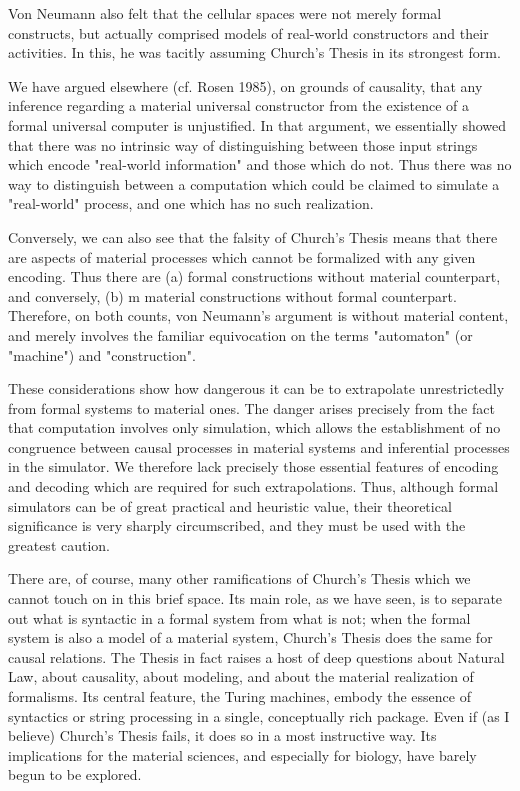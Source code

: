 \documentclass[a4paper,12pt]{article}
\begin{document}
Von Neumann also felt that the cellular spaces were not merely formal constructs, but actually comprised models of real-world
constructors and their activities. In this, he was tacitly assuming Church's Thesis in its strongest form.

We have argued elsewhere (cf. Rosen 1985), on grounds of causality, that
any inference regarding a material universal constructor from the existence
of a formal universal computer is unjustified.  In that argument, we essentially
showed that there was no intrinsic way of distinguishing between
those input strings which encode "real-world information" and those which
do not. Thus there was no way to distinguish between a computation which
could be claimed to simulate a "real-world" process, and one which has no
such realization.

Conversely, we can also see that the falsity of Church's Thesis means that there are aspects of material processes which cannot be formalized with any given encoding.
Thus there are (a) formal constructions without material counterpart, and conversely, (b) m material constructions without formal counterpart.
Therefore, on both counts, von Neumann's argument is without material content, and merely involves the familiar equivocation on
the terms "automaton" (or "machine") and "construction".

These considerations show how dangerous it can be to extrapolate unrestrictedly from formal systems to material ones.
The danger arises precisely from the fact that computation involves only simulation, which allows the establishment of
no congruence between causal processes in material systems and inferential processes in the simulator. We therefore lack precisely
those essential features of encoding and decoding which are required for such extrapolations. Thus, although formal simulators can be of
great practical and heuristic value, their theoretical significance is very sharply circumscribed, and they must be used with the greatest caution.

There are, of course, many other ramifications of Church's Thesis which we cannot touch on in this brief space. Its main role, as we have seen,
is to separate out what is syntactic in a formal system from what is not; when the formal system is also a model of a material system,
Church's Thesis does the same for causal relations. The Thesis in fact raises a host of deep questions about Natural Law, about causality,
about modeling, and about the material realization of formalisms. Its central feature, the Turing machines, embody the essence of syntactics
or string processing in a single, conceptually rich package. Even if (as I believe) Church's Thesis fails, it does so in a most instructive way.
Its implications for the material sciences, and especially for biology, have barely begun to be explored.
\end{document}
